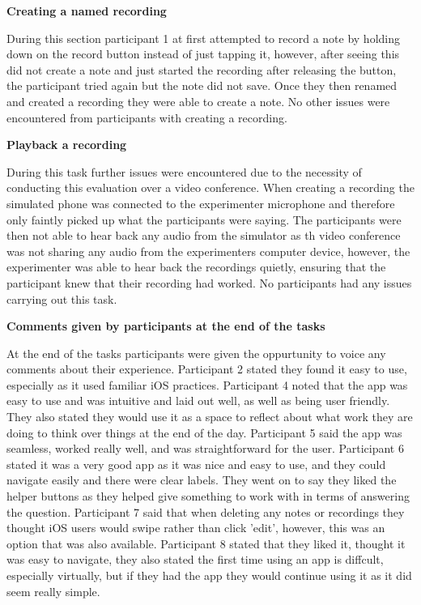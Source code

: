 \documentclass{l4proj}
\begin{document}
\textbf{Creating a named recording}
\par 
During this section participant 1 at first attempted to record a note by holding down on the record button instead of just tapping 
it, however, after seeing this did not create a note and just started the recording after releasing the button, the participant tried 
again but the note did not save. Once they then renamed and created a recording they were able to create a note. No other issues
were encountered from participants with creating a recording.

\textbf{Playback a recording}
\par 
During this task further issues were encountered due to the necessity of conducting this evaluation over a video conference. 
When creating a recording the simulated phone was connected to the experimenter microphone and therefore only faintly 
picked up what the participants were saying. The participants were then not able to hear back any audio from the simulator
as th video conference was not sharing any audio from the experimenters computer device, however, the experimenter was
able to hear back the recordings quietly, ensuring that the participant knew that their recording had worked. No participants
had any issues carrying out this task.

\textbf{Comments given by participants at the end of the tasks}
\par 
At the end of the tasks participants were given the oppurtunity to voice any comments about their experience. Participant 2
stated they found it easy to use, especially as it used familiar iOS practices. Participant 4 noted that the app was easy to 
use and was intuitive and laid out well, as well as being user friendly. They also stated they would use it as a space to reflect 
about what work they are doing to think over things at the end of the day. Participant 5 said the app was seamless, worked really 
well, and was straightforward for the user. Participant 6 stated it was a very good app as it was nice and easy to use, 
and they could navigate easily and there were clear labels. They went on to say they liked the helper buttons as they helped 
give something to work with in terms of answering the question. Participant 7 said that when deleting any notes or recordings they
thought iOS users would swipe rather than click 'edit', however, this was an option that was also available. Participant 8 stated
that they liked it, thought it was easy to navigate, they also stated the first time using an app is diffcult, especially 
virtually, but if they had the app they would continue using it as it did seem really simple.
\end{document}
